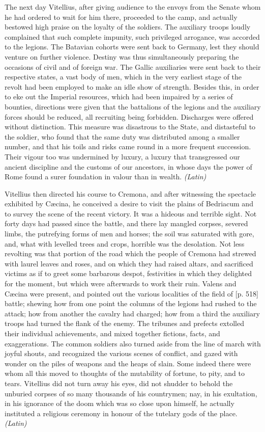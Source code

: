 The next day Vitellius, after giving audience to the envoys from the Senate whom he had ordered to wait for him there, proceeded to the camp, and actually bestowed high praise on the loyalty of the soldiers. The auxiliary troops loudly complained that such complete impunity, such privileged arrogance, was accorded to the legions. The Batavian cohorts were sent back to Germany, lest they should venture on further violence. Destiny was thus simultaneously preparing the occasions of civil and of foreign war. The Gallic auxiliaries were sent back to their respective states, a vast body of men, which in the very earliest stage of the revolt had been employed to make an idle show of strength. Besides this, in order to eke out the Imperial resources, which had been impaired by a series of bounties, directions were given that the battalions of the legions and the auxiliary forces should be reduced, all recruiting being forbidden. Discharges were offered without distinction. This measure was disastrous to the State, and distasteful to the soldier, who found that the same duty was distributed among a smaller number, and that his toils and risks came round in a more frequent succession. Their vigour too was undermined by luxury, a luxury that transgressed our ancient discipline and the customs of our ancestors, in whose days the power of Rome found a surer foundation in valour than in wealth. \emph{(Latin)}


Vitellius then directed his course to Cremona, and after witnessing the spectacle exhibited by Cæcina, he conceived a desire to visit the plains of Bedriacum and to survey the scene of the recent victory. It was a hideous and terrible sight. Not forty days had passed since the battle, and there lay mangled corpses, severed limbs, the putrefying forms of men and horses; the soil was saturated with gore, and, what with levelled trees and crops, horrible was the desolation. Not less revolting was that portion of the road which the people of Cremona had strewed with laurel leaves and roses, and on which they had raised altars, and sacrificed victims as if to greet some barbarous despot, festivities in which they delighted for the moment, but which were afterwards to work their ruin. Valens and Cæcina were present, and pointed out the various localities of the field of [p. 518] battle; shewing how from one point the columns of the legions had rushed to the attack; how from another the cavalry had charged; how from a third the auxiliary troops had turned the flank of the enemy. The tribunes and prefects extolled their individual achievements, and mixed together fictions, facts, and exaggerations. The common soldiers also turned aside from the line of march with joyful shouts, and recognized the various scenes of conflict, and gazed with wonder on the piles of weapons and the heaps of slain. Some indeed there were whom all this moved to thoughts of the mutability of fortune, to pity, and to tears. Vitellius did not turn away his eyes, did not shudder to behold the unburied corpses of so many thousands of his countrymen; nay, in his exultation, in his ignorance of the doom which was so close upon himself, he actually instituted a religious ceremony in honour of the tutelary gods of the place. \emph{(Latin)}

